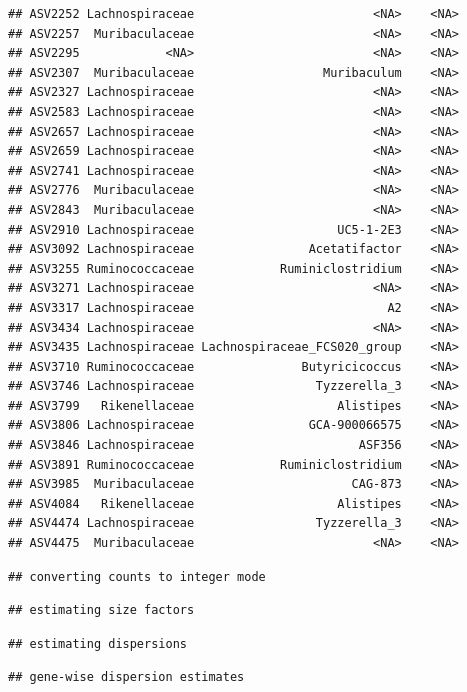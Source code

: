 \documentclass[]{article}
\begin{document}
\begin{verbatim}
## ASV2252 Lachnospiraceae                         <NA>    <NA>
## ASV2257  Muribaculaceae                         <NA>    <NA>
## ASV2295            <NA>                         <NA>    <NA>
## ASV2307  Muribaculaceae                  Muribaculum    <NA>
## ASV2327 Lachnospiraceae                         <NA>    <NA>
## ASV2583 Lachnospiraceae                         <NA>    <NA>
## ASV2657 Lachnospiraceae                         <NA>    <NA>
## ASV2659 Lachnospiraceae                         <NA>    <NA>
## ASV2741 Lachnospiraceae                         <NA>    <NA>
## ASV2776  Muribaculaceae                         <NA>    <NA>
## ASV2843  Muribaculaceae                         <NA>    <NA>
## ASV2910 Lachnospiraceae                    UC5-1-2E3    <NA>
## ASV3092 Lachnospiraceae                Acetatifactor    <NA>
## ASV3255 Ruminococcaceae            Ruminiclostridium    <NA>
## ASV3271 Lachnospiraceae                         <NA>    <NA>
## ASV3317 Lachnospiraceae                           A2    <NA>
## ASV3434 Lachnospiraceae                         <NA>    <NA>
## ASV3435 Lachnospiraceae Lachnospiraceae_FCS020_group    <NA>
## ASV3710 Ruminococcaceae               Butyricicoccus    <NA>
## ASV3746 Lachnospiraceae                 Tyzzerella_3    <NA>
## ASV3799   Rikenellaceae                    Alistipes    <NA>
## ASV3806 Lachnospiraceae                GCA-900066575    <NA>
## ASV3846 Lachnospiraceae                       ASF356    <NA>
## ASV3891 Ruminococcaceae            Ruminiclostridium    <NA>
## ASV3985  Muribaculaceae                      CAG-873    <NA>
## ASV4084   Rikenellaceae                    Alistipes    <NA>
## ASV4474 Lachnospiraceae                 Tyzzerella_3    <NA>
## ASV4475  Muribaculaceae                         <NA>    <NA>
\end{verbatim}

\begin{verbatim}
## converting counts to integer mode
\end{verbatim}

\begin{verbatim}
## estimating size factors
\end{verbatim}

\begin{verbatim}
## estimating dispersions
\end{verbatim}

\begin{verbatim}
## gene-wise dispersion estimates
\end{verbatim}
\end{document}
